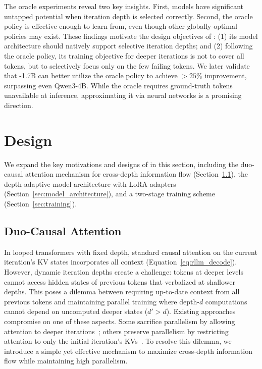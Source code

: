 The oracle experiments reveal two key insights.
First, models have significant untapped potential when iteration depth is selected correctly.
Second, the oracle policy is effective enough to learn from, even though other globally optimal policies may exist.
These findings motivate the design objectives of \name: (1) its model architecture should natively support selective iteration depths; and (2) following the oracle policy, its training objective for deeper iterations is not to cover all tokens, but to selectively focus only on the few failing tokens.
We later validate that \name-1.7B can better utilize the oracle policy to achieve $>25\%$ improvement, surpassing even Qwen3-4B.
While the oracle requires ground-truth tokens unavailable at inference, approximating it via neural networks is a promising direction.

\section{\name Design}
\label{sec:method}

We expand the key motivations and designs of \name in this section, including the duo-causal attention mechanism for cross-depth information flow (Section~\ref{sec:duo_attention}), the depth-adaptive model architecture with LoRA adapters (Section~\ref{sec:model_architecture}), and a two-stage training scheme (Section~\ref{sec:training}).

\subsection{Duo-Causal Attention}
\label{sec:duo_attention}
In looped transformers with fixed depth, standard causal attention on the current iteration's KV states incorporates all context (Equation~\ref{eq:rllm_decode}). 
However, dynamic iteration depths create a challenge: tokens at deeper levels cannot access hidden states of previous tokens that verbalized at shallower depths.
This poses a dilemma between requiring up-to-date context from all previous tokens and maintaining parallel training where depth-$d$ computations cannot depend on uncomputed deeper states ($d'>d$).
Existing approaches compromise on one of these aspects. Some sacrifice parallelism by allowing attention to deeper iterations~\citep{hao2024training}; others preserve parallelism by restricting attention to only the initial iteration's KVs~\citep{bae2025mor}.
To resolve this dilemma, we introduce a simple yet effective mechanism to maximize cross-depth information flow while maintaining high parallelism.

